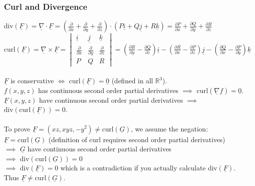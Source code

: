 \documentclass{article}
\begin{document}
			\subsubsection{Curl and Divergence}
				$\text{div}(\underline{F}) = \underline{\nabla} \cdot \underline{F} = (\frac{\partial}{\partial x} + \frac{\partial}{\partial y} + \frac{\partial}{\partial z}) \cdot (P\underline{i} + Q\underline{j} + R\underline{k}) = \frac{\partial P}{\partial x} + \frac{\partial Q}{\partial y} + \frac{\partial R}{\partial z}$ \\
				$\text{curl}(\underline{F})= \underline{\nabla} \times \underline{F} = \begin{vmatrix} \underline{i} & \underline{j} & \underline{k} \\ \frac{\partial}{\partial x} & \frac{\partial}{\partial y} & \frac{\partial}{\partial z} \\ P & Q & R \end{vmatrix} = (\frac{\partial R}{\partial y}-\frac{\partial Q}{\partial z})\underline{i}-(\frac{\partial R}{\partial x}-\frac{\partial P}{\partial z})\underline{j}-(\frac{\partial Q}{\partial x}-\frac{\partial P}{\partial y})\underline{k}$ \\
				\\
				$\underline{F}$ is conservative $\iff$ $\text{curl}(\underline{F}) = \underline{0}$ (defined in all $\mathbb{R}^3$). \\
				$f(x,y,z)$ has continuous second order partial derivatives $\implies$ $\text{curl}(\underline{\nabla}f) = \underline{0}.$ \\
				$\underline{F}(x,y,z)$ have continuous second order partial derivatives $\implies$ $\text{div}(\text{curl}(\underline{F})) = 0$. \\
				\\
				To prove $\underline{F}=(xz,xyz,-y^2) \neq \text{curl}(\underline{G})$, we assume the negation: \\
				$\underline{F} = \text{curl}(\underline{G})$ (definition of curl requires second order partial derivatives)\\
				$\implies$ $\underline{G}$ have continuous second order partial derivatives \\
				$\implies$ $\text{div}(\text{curl}(\underline{G})) = 0$ \\
				$\implies$ $\text{div}(\underline{F}) = 0$ which is a contradiction if you actually calculate $\text{div}(\underline{F})$. \\
				Thus $\underline{F} \neq \text{curl}(\underline{G})$. \\
	
\end{document}
